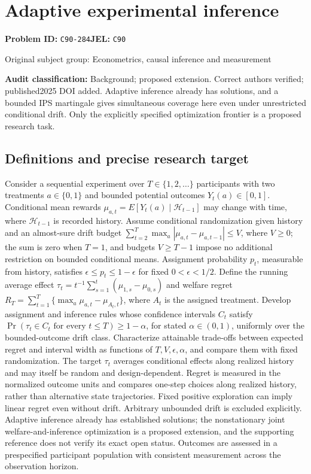 \documentclass[11pt,a4paper]{article}
\begin{document}
\section*{Adaptive experimental inference}
\textbf{Problem ID:} \texttt{C90-284}\quad \textbf{JEL:} \texttt{C90}\par
\label{problem:OP-0428}
{\sffamily\small\color{muted}Original subject group: Econometrics, causal inference and measurement\par}
\label{definitions:problem:30007710}
\textbf{Audit classification:} Background; proposed extension. Correct authors verified; published2025 DOI added. Adaptive inference already has solutions, and a bounded IPS martingale gives simultaneous coverage here even under unrestricted conditional drift. Only the explicitly specified optimization frontier is a proposed research task.
\subsection*{Definitions and precise research target}
Consider a sequential experiment over \(T\in\{1,2,\ldots\}\) participants with two treatments \(a\in\{0,1\}\) and bounded potential outcomes \(Y_t(a)\in[0,1]\). Conditional mean rewards \(\mu_{a,t}=E[Y_t(a)\mid\mathcal H_{t-1}]\) may change with time, where \(\mathcal H_{t-1}\) is recorded history. Assume conditional randomization given history and an almost-sure drift budget \(\sum_{t=2}^{T}\max_a|\mu_{a,t}-\mu_{a,t-1}|\leq V\), where \(V\geq0\); the sum is zero when \(T=1\), and budgets \(V\geq T-1\) impose no additional restriction on bounded conditional means. Assignment probability \(p_t\), measurable from history, satisfies \(\epsilon\leq p_t\leq1-\epsilon\) for fixed \(0<\epsilon<1/2\). Define the running average effect \(\tau_t=t^{-1}\sum_{s=1}^{t}(\mu_{1,s}-\mu_{0,s})\) and welfare regret \(R_T=\sum_{t=1}^{T}\{\max_a\mu_{a,t}-\mu_{A_t,t}\}\), where \(A_t\) is the assigned treatment. Develop assignment and inference rules whose confidence intervals \(C_t\) satisfy \(\Pr(\tau_t\in C_t\text{ for every }t\leq T)\geq1-\alpha\), for stated \(\alpha\in(0,1)\), uniformly over the bounded-outcome drift class. Characterize attainable trade-offs between expected regret and interval width as functions of \(T,V,\epsilon,\alpha\), and compare them with fixed randomization. The target \(\tau_t\) averages conditional effects along realized history and may itself be random and design-dependent. Regret is measured in the normalized outcome units and compares one-step choices along realized history, rather than alternative state trajectories. Fixed positive exploration can imply linear regret even without drift. Arbitrary unbounded drift is excluded explicitly. Adaptive inference already has established solutions; the nonstationary joint welfare-and-inference optimization is a proposed extension, and the supporting reference does not verify its exact open status. Outcomes are assessed in a prespecified participant population with consistent measurement across the observation horizon.
\end{document}
